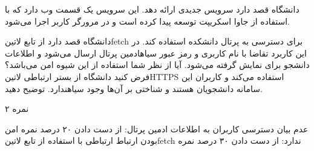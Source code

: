 \documentclass[../main.tex]{subfiles}
\begin{document}

دانشگاه قصد دارد سرویس جدیدی ارائه دهد.
این سرویس یک قسمت وب دارد که با استفاده از جاوا اسکریپت توسعه پیدا
کرده است و در مرورگر کاربر اجرا می‌شود.

دانشگاه قصد دارد از تابع ‌لاتین{fetch} برای دسترسی به پرتال دانشکده استفاده کند.
در این کاربرد تقاضا با نام کاربری و رمز عبور ‌سیاه{ادمین} پرتال ارسال می‌شود و اطلاعات دانشجو برای نمایش گرفته می‌شود.
آیا از نظر شما استفاده از این شیوه امن می‌باشد؟ فرض کنید دانشگاه از بستر ارتباطی ‌لاتین{HTTPS} استفاده می‌کند و
کاربران این سامانه دانشجویان هستند و شناختی بر آن‌ها وجود ‌سیاه{ندارد}.
توضیح دهید.

۲ نمره

\begin{answer}
 عدم بیان دسترسی کاربران به اطلاعات ادمین پرتال: از دست دادن ۲۰ درصد نمره
 امن بودن ارتباط ارتباطی با استفاده از تابع ‌لاتین{fetch} ندارد: از دست دادن ۳۰ درصد نمره
\end{answer}
\end{document}
